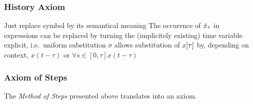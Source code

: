 \documentclass[10pt]{report}
\begin{document}


        \subsubsection{History Axiom}
            \label{history-axiom}
            Just replace symbol by its semantical meaning
            The occurence of $\bar{x}_{\tau}$ in expressions can be replaced by turning the (implicitely existing) time variable explicit, i.e.\
            uniform substitution $\sigma$
            allows substitution of $x[\tau]$ by, depending on context, $x(t-\tau)$ or $\forall{s\in[0,\tau]}{x(t-\tau)}$

            \begin{calculus}
            \end{calculus}

        \subsubsection{Axiom of Steps}
            \label{sec:axiom-of-steps}
            The \emph{Method of Steps} presented above translates into an axiom.

            \begin{calculus}

            \end{calculus}
\end{document}
